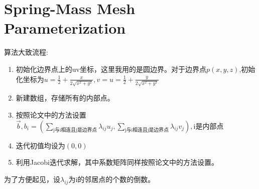 \documentclass[12pt, a4paper]{ctexart}
\begin{document}
\section{Spring-Mass Mesh Parameterization}

算法大致流程:

\begin{enumerate}
    \item 初始化边界点上的uv坐标，这里我用的是圆边界。对于边界点$p(x,y,z)$,初始化坐标为$u = \frac{1}{2} + \frac{x}{2\sqrt{x^{2} + y^{2}}},v=u = \frac{1}{2} + \frac{y}{2\sqrt{x^{2} + y^{2}}}$
    \item 新建数组，存储所有的内部点。
    \item 按照论文中的方法设置$\vec{b},b_{i} = (\sum_{\mbox{j与i相连且j是边界点}} \lambda_{ij} u_{j}, \sum_{\mbox{j与i相连且j是边界点}} \lambda_{ij} v_{j}),\mbox{i是内部点}$
    \item 迭代初值均设为$(0,0)$
    \item 利用Jacobi迭代求解，其中系数矩阵同样按照论文中的方法设置。
\end{enumerate}

为了方便起见，设$\lambda_{ij}$为i的邻居点的个数的倒数。
\end{document}
